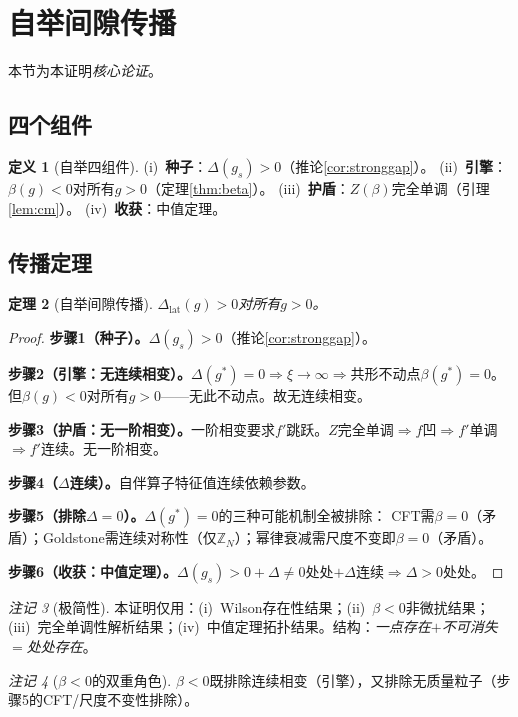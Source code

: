 \documentclass[12pt,a4paper]{article}
\theoremstyle{plain}
\newtheorem{theorem}{定理}[section]\newtheorem{lemma}[theorem]{引理}\newtheorem{corollary}[theorem]{推论}\newtheorem{proposition}[theorem]{命题}
\theoremstyle{definition}\newtheorem{definition}[theorem]{定义}
\theoremstyle{remark}\newtheorem{remark}[theorem]{注记}
\begin{document}
\section{自举间隙传播}\label{sec:bootstrap}
本节为本证明\emph{核心论证}。
\subsection{四个组件}\label{sec:components}
\begin{definition}[自举四组件]\label{def:bootstrap}
(i)~\textbf{种子}：$\Delta(g_s)>0$（推论\ref{cor:stronggap}）。
(ii)~\textbf{引擎}：$\beta(g)<0$对所有$g>0$（定理\ref{thm:beta}）。
(iii)~\textbf{护盾}：$Z(\beta)$完全单调（引理\ref{lem:cm}）。
(iv)~\textbf{收获}：中值定理。
\end{definition}
\subsection{传播定理}\label{sec:propagation}
\begin{theorem}[自举间隙传播]\label{thm:bootstrap}
$\Delta_{\mathrm{lat}}(g)>0$对所有$g>0$。
\end{theorem}
\begin{proof}
\textbf{步骤1（种子）。}$\Delta(g_s)>0$（推论\ref{cor:stronggap}）。

\textbf{步骤2（引擎：无连续相变）。}$\Delta(g^*)=0\Rightarrow\xi\to\infty\Rightarrow$共形不动点$\beta(g^*)=0$。但$\beta(g)<0$对所有$g>0$——无此不动点。故无连续相变。

\textbf{步骤3（护盾：无一阶相变）。}一阶相变要求$f'$跳跃。$Z$完全单调$\Rightarrow f$凹$\Rightarrow f'$单调$\Rightarrow f'$连续。无一阶相变。

\textbf{步骤4（$\Delta$连续）。}自伴算子特征值连续依赖参数。

\textbf{步骤5（排除$\Delta=0$）。}$\Delta(g^*)=0$的三种可能机制全被排除：
CFT需$\beta=0$（矛盾）；Goldstone需连续对称性（仅$\mathbb{Z}_N$）；幂律衰减需尺度不变即$\beta=0$（矛盾）。

\textbf{步骤6（收获：中值定理）。}$\Delta(g_s)>0+\Delta\neq 0$处处$+\Delta$连续$\Rightarrow\Delta>0$处处。
\end{proof}
\begin{remark}[极简性]
本证明仅用：(i)~Wilson存在性结果；(ii)~$\beta<0$非微扰结果；(iii)~完全单调性解析结果；(iv)~中值定理拓扑结果。结构：\emph{一点存在$+$不可消失$=$处处存在}。
\end{remark}
\begin{remark}[$\beta<0$的双重角色]
$\beta<0$既排除连续相变（引擎），又排除无质量粒子（步骤5的CFT/尺度不变性排除）。
\end{remark}
\end{document}
